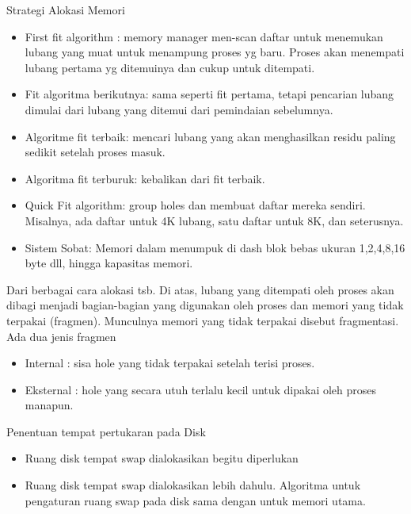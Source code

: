 Strategi Alokasi Memori
\begin{itemize}

\item First fit algorithm : memory  manager men-scan daftar untuk  menemukan lubang yang muat untuk menampung proses yg baru. Proses akan menempati lubang pertama yg ditemuinya dan cukup untuk ditempati.
\item Fit algoritma berikutnya: sama seperti fit pertama, tetapi pencarian lubang dimulai dari lubang yang ditemui dari pemindaian sebelumnya.
\item Algoritme fit terbaik: mencari lubang yang akan menghasilkan residu paling sedikit setelah proses masuk.
\item Algoritma fit terburuk: kebalikan dari fit terbaik.
\item Quick Fit algorithm: group holes dan membuat daftar mereka sendiri. Misalnya, ada daftar untuk 4K lubang, satu daftar untuk 8K, dan seterusnya.
\item Sistem Sobat: Memori dalam menumpuk di dash blok bebas ukuran 1,2,4,8,16 byte dll, hingga kapasitas memori.

\end{itemize}

Dari berbagai cara alokasi tsb. Di atas, lubang yang ditempati oleh proses akan dibagi menjadi bagian-bagian yang digunakan oleh proses dan memori yang tidak terpakai (fragmen). Munculnya memori yang tidak terpakai disebut fragmentasi. Ada dua jenis fragmen

\begin{itemize}

\item Internal : sisa hole yang tidak terpakai setelah terisi proses.
\item Eksternal : hole yang secara utuh terlalu kecil untuk dipakai oleh proses manapun.

\end{itemize}

Penentuan tempat pertukaran pada Disk
\begin{itemize}
\item Ruang disk tempat swap dialokasikan begitu diperlukan
\item Ruang disk tempat swap dialokasikan lebih dahulu.
Algoritma untuk pengaturan ruang swap pada disk sama dengan  untuk memori utama.
\end{itemize}

